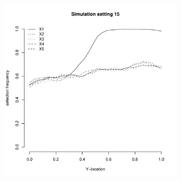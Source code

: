 \documentclass[authoryear, review, 11pt]{elsarticle}
\begin{document}
\begin{figure}
\begin{subfigure}[b]{0.3\textwidth}
			\label{fig:tiger}
		\end{subfigure}
        ~ %
		\begin{subfigure}[b]{0.3\textwidth}
			\centering
			\includegraphics[width=\textwidth]{../../figures/simulation/28-15-profile-selection.pdf}
			\label{fig:mouse}
		\end{subfigure}
	\end{figure}
	
\end{document}
